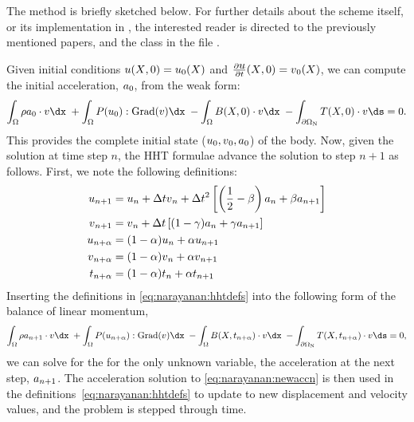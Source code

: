 The method is briefly sketched below. For further details about the scheme
itself, or its implementation in \twist, the interested reader is directed
to the previously mentioned papers, and the 
class in the file .

Given initial conditions $\mbox{$ u$}(\mbox{$ X$}, 0) = \mbox{$ u$}_{0}(\mbox{$ X$})$ and
$\frac{\partial\mbox{$ u$}}{\partial t}(\mbox{$ X$}, 0) = \mbox{$ v$}_{0}(\mbox{$ X$})$, we can
compute the initial acceleration, $\mbox{$ a$}_{0}$, from the weak form:
\begin{equation}
  \int_{\Omega} \rho a_{0} \cdot \bv \dx\; +  \int_{\Omega}
\bP(u_{0}):\mathrm{Grad}(\bv) \dx\; - \int_{\Omega} \bB(X, 0)
\cdot \bv \dx\; -  \int_{\partial\Omega_{\mathrm{N}}}
\bT(X, 0) \cdot \bv \ds = 0.
\end{equation}
This provides the complete initial state ($\mbox{$ u$}_{0}, \mbox{$ v$}_{0}, \mbox{$ a$}_{0}$)
of the body. Now, given the solution at time step $n$, the HHT formulae
advance the solution to step $n+1$ as follows. First, we note the
following definitions:
\begin{equation}
\begin{split}
\mbox{$ u$}_{n+1} & = \mbox{$ u$}_{n} + \Delta t \mbox{$ v$}_{n} + \Delta t^{2} \left[
  \left(\frac{1}{2} - \beta \right) \mbox{$ a$}_{n} + \beta \mbox{$ a$}_{n+1}
\right]\\
\mbox{$ v$}_{n+1} & = \mbox{$ v$}_{n} + \Delta t \left[ (1-\gamma) \mbox{$ a$}_{n} + \gamma
  \mbox{$ a$}_{n+1} \right]\\
\mbox{$ u$}_{n+\alpha} & = (1 - \alpha) \mbox{$ u$}_{n} + \alpha \mbox{$ u$}_{n+1}\\
\mbox{$ v$}_{n+\alpha} & = (1 - \alpha) \mbox{$ v$}_{n} + \alpha \mbox{$ v$}_{n+1}\\
t_{n+\alpha} &= (1 - \alpha) t_{n} + \alpha t_{n + 1}
\end{split}
\label{eq:narayanan:hhtdefs}
\end{equation}
Inserting the definitions in \eqref{eq:narayanan:hhtdefs}
into the following form of the balance of linear momentum,
\begin{equation}
   \int_{\Omega} \rho a_{n+1} \cdot \bv \dx\; + \int_{\Omega} \bP(u_{n
+ \alpha}):\mathrm{Grad}(\bv) \dx\; - \int_{\Omega} \bB(X, t_{n +
\alpha}) \cdot \bv \dx\; - \int_{\partial\Omega_{\mathrm{N}}} \bT(X,
t_{n + \alpha}) \cdot \bv \ds = 0,
\label{eq:narayanan:newaccn}
\end{equation}
we can solve for the for the only unknown variable, the
acceleration at the next step, $\mbox{$ a$}_{n+1}$. The acceleration solution
to \eqref{eq:narayanan:newaccn} is then used in the
definitions~\eqref{eq:narayanan:hhtdefs} to update to new displacement
and velocity values, and the problem is stepped through time.

